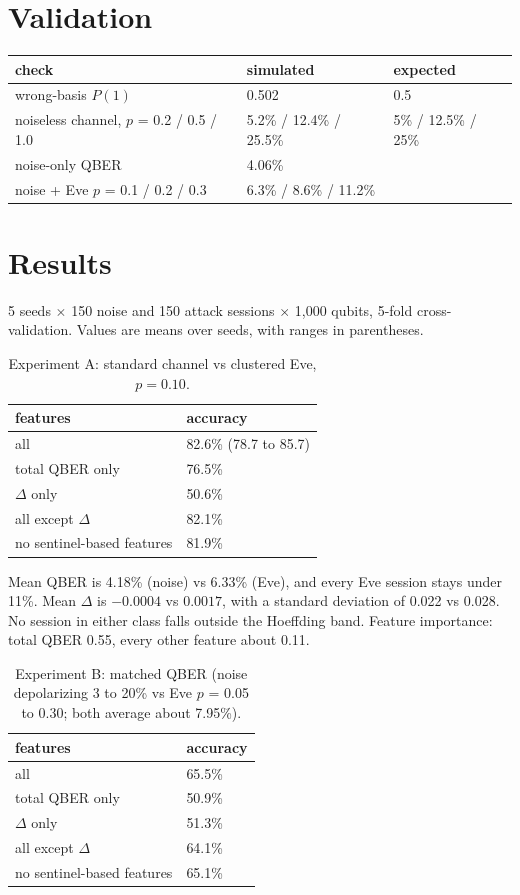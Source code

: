 \documentclass[11pt]{article}
\begin{document}
\section{Validation}
\begin{center}\begin{tabular}{lll}\toprule
check & simulated & expected\\\midrule
wrong-basis $P(1)$ & 0.502 & 0.5\\
noiseless channel, $p$ = 0.2 / 0.5 / 1.0 & 5.2\% / 12.4\% / 25.5\% & 5\% / 12.5\% / 25\%\\
noise-only QBER & 4.06\% & \\
noise + Eve $p$ = 0.1 / 0.2 / 0.3 & 6.3\% / 8.6\% / 11.2\% & \\\bottomrule
\end{tabular}\end{center}

\section{Results}
5 seeds $\times$ 150 noise and 150 attack sessions $\times$ 1,000 qubits, 5-fold cross-validation. Values are means over seeds, with ranges in parentheses.

\begin{table}[h]\centering
\caption{Experiment A: standard channel vs clustered Eve, $p=0.10$.}
\begin{tabular}{ll}\toprule features & accuracy\\\midrule
all & 82.6\% (78.7 to 85.7)\\
total QBER only & 76.5\%\\
$\Delta$ only & 50.6\%\\
all except $\Delta$ & 82.1\%\\
no sentinel-based features & 81.9\%\\\bottomrule\end{tabular}\end{table}

Mean QBER is 4.18\% (noise) vs 6.33\% (Eve), and every Eve session stays under 11\%. Mean $\Delta$ is $-0.0004$ vs $0.0017$, with a standard deviation of 0.022 vs 0.028. No session in either class falls outside the Hoeffding band. Feature importance: total QBER 0.55, every other feature about 0.11.

\begin{table}[h]\centering
\caption{Experiment B: matched QBER (noise depolarizing 3 to 20\% vs Eve $p$ = 0.05 to 0.30; both average about 7.95\%).}
\begin{tabular}{ll}\toprule features & accuracy\\\midrule
all & 65.5\%\\
total QBER only & 50.9\%\\
$\Delta$ only & 51.3\%\\
all except $\Delta$ & 64.1\%\\
no sentinel-based features & 65.1\%\\\bottomrule\end{tabular}\end{table}
\end{document}
